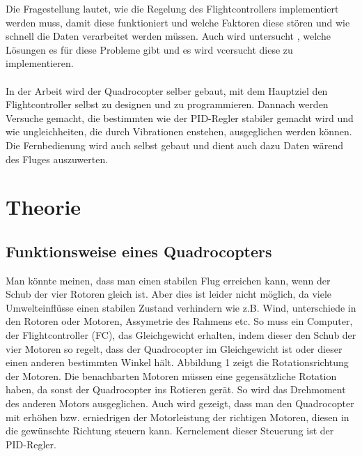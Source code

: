 \documentclass[12pt,a4paper, ngerman]{article}
\begin{document}
\fi
Die Fragestellung lautet, wie die Regelung des Flightcontrollers implementiert werden muss, damit diese funktioniert und welche Faktoren diese stören und wie schnell die Daten verarbeitet werden müssen. Auch wird untersucht , welche Lösungen es für diese Probleme gibt und es wird vcersucht diese zu implementieren. \\ \\
In der Arbeit wird der Quadrocopter selber gebaut, mit dem Hauptziel den Flightcontroller selbst zu designen und zu programmieren. Dannach werden Versuche gemacht, die bestimmten wie der PID-Regler stabiler gemacht wird und wie ungleichheiten, die durch Vibrationen enstehen, ausgeglichen werden können. Die Fernbedienung wird auch selbst gebaut und dient auch dazu Daten wärend des Fluges auszuwerten. 
\newpage
\section{Theorie}
\subsection{Funktionsweise eines Quadrocopters}
Man könnte meinen, dass man einen stabilen Flug erreichen kann, wenn der Schub der vier Rotoren gleich ist. Aber dies ist leider nicht möglich, da viele Umwelteinflüsse einen stabilen Zustand verhindern wie z.B. Wind, unterschiede in den Rotoren oder Motoren, Assymetrie des Rahmens etc. So muss ein Computer, der Flightcontroller (FC), das Gleichgewicht erhalten, indem dieser den Schub der vier Motoren so regelt, dass der Quadrocopter im Gleichgewicht ist oder dieser einen anderen bestimmten Winkel hält. Abbildung 1 zeigt die Rotationsrichtung der Motoren. Die benachbarten Motoren müssen eine gegensätzliche Rotation haben, da sonst der Quadrocopter ins Rotieren gerät. So wird das Drehmoment des anderen Motors ausgeglichen. Auch wird gezeigt, dass man den Quadrocopter mit erhöhen bzw. erniedrigen der Motorleistung der richtigen Motoren, diesen in die gewünschte Richtung steuern kann. Kernelement dieser Steuerung ist der PID-Regler.
\newpage
\end{document}
